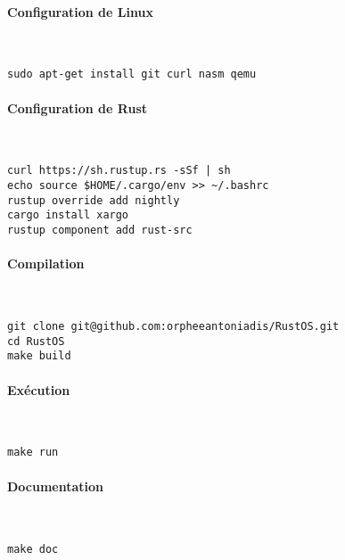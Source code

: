 \documentclass[a4paper, 12pt]{article}
\begin{document}
\paragraph{Configuration de Linux} \mbox{} \\
\begin{verbatim}
sudo apt-get install git curl nasm qemu
\end{verbatim}

\paragraph{Configuration de Rust} \mbox{} \\
\begin{verbatim}
curl https://sh.rustup.rs -sSf | sh
echo source $HOME/.cargo/env >> ~/.bashrc
rustup override add nightly
cargo install xargo
rustup component add rust-src
\end{verbatim}

\paragraph{Compilation} \mbox{} \\
\begin{verbatim}
git clone git@github.com:orpheeantoniadis/RustOS.git
cd RustOS
make build
\end{verbatim}

\paragraph{Exécution} \mbox{} \\
\begin{verbatim}
make run
\end{verbatim}

\paragraph{Documentation} \mbox{} \\
\begin{verbatim}
make doc
\end{verbatim}
\end{document}
